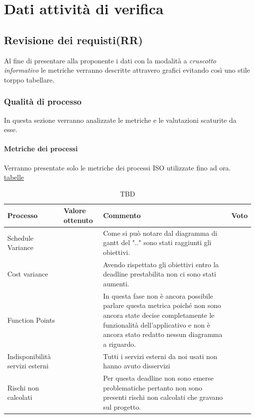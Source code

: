\section{Dati attività di verifica}
\subsection{Revisione dei requisti(RR)}
Al fine di presentare alla proponente i dati con la modalità a \textit{cruscotto informativo} le metriche verranno descritte attravero grafici evitando così uno stile torppo tabellare.
\subsubsection{Qualità di processo}
In questa sezione verranno analizzate le metriche e le valutazioni scaturite da esse.
\clearpage
\paragraph{Metriche dei processi}
\hspace{10cm} %
\newline Verranno presentate solo le metriche dei processi ISO utilizzate fino ad ora.
\href{https://www.tablesgenerator.com/}{tabelle}
\begin{table}[!htbp]
	\centering
	\renewcommand{\arraystretch}{3} 
	\begin{tabular}{|l|l|l|l|}
		\rowcolor{orange!50}
		\hline
		\textbf{Processo} & \parbox{2cm}{\textbf{Valore ottenuto}} & \textbf{Commento} & \textbf{Voto} \\
		\hline
		Schedule Variance & & \parbox{8cm}{Come si può notare dal diagramma di gantt del ".." sono stati raggiunti gli obiettivi.} & \\
		\hline
		Cost variance & & \parbox{8cm}{Avendo rispettato gli obiettivi entro la deadline prestabilita non ci sono stati aumenti.} &\\
		\hline
		Function Points & & \parbox{8cm}{In questa fase non è ancora possibile parlare questa metrica poiché non sono ancora state decise completamente le funzionalità dell'applicativo e non è ancora stato redatto nessun diagramma a riguardo.} & \\
		\hline
		\parbox{2.5cm}{Indisponibilità servizi esterni} & & \parbox{8cm}{Tutti i servizi esterni da noi usati non hanno avuto disservizi } & \\
		\hline
		\parbox{2.5cm}{Rischi non calcolati} & & \parbox{8cm}{Per questa deadline non sono emerse problematiche pertanto non sono presenti rischi non calcolati che gravano sul progetto.} & \\
		\hline
	\end{tabular}
	\caption{TBD}
\end{table}
\clearpage
